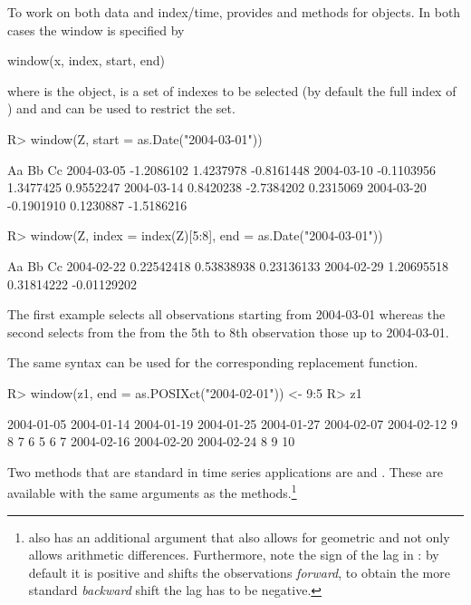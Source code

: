 \documentclass{Z}
\begin{document}
To work on both data and index/time,  provides
 and  methods for  objects.
In both cases the window is specified by
\begin{Scode}
window(x, index, start, end)
\end{Scode}
where  is the  object,  is a set
of indexes to be selected (by default the full index of )
and  and  can be used to restrict the 
 set. 
\begin{Schunk}
\begin{Sinput}
R> window(Z, start = as.Date("2004-03-01"))
\end{Sinput}
\begin{Soutput}
           Aa         Bb         Cc        
2004-03-05 -1.2086102  1.4237978 -0.8161448
2004-03-10 -0.1103956  1.3477425  0.9552247
2004-03-14  0.8420238 -2.7384202  0.2315069
2004-03-20 -0.1901910  0.1230887 -1.5186216
\end{Soutput}
\begin{Sinput}
R> window(Z, index = index(Z)[5:8], end = as.Date("2004-03-01"))
\end{Sinput}
\begin{Soutput}
           Aa          Bb          Cc         
2004-02-22  0.22542418  0.53838938  0.23136133
2004-02-29  1.20695518  0.31814222 -0.01129202
\end{Soutput}
\end{Schunk}

The first example selects all observations starting from 2004-03-01
whereas the second selects from the from the 5th to 8th observation
those up to 2004-03-01.

The same syntax can be used for the corresponding replacement function.
\begin{Schunk}
\begin{Sinput}
R> window(z1, end = as.POSIXct("2004-02-01")) <- 9:5
R> z1
\end{Sinput}
\begin{Soutput}
2004-01-05 2004-01-14 2004-01-19 2004-01-25 2004-01-27 2004-02-07 2004-02-12 
         9          8          7          6          5          6          7 
2004-02-16 2004-02-20 2004-02-24 
         8          9         10 
\end{Soutput}
\end{Schunk}

Two methods that are standard in time series applications
are  and . These are available with the same
arguments as the  methods.\footnote{ also
has an additional argument that also allows for geometric and
not only allows arithmetic differences. Furthermore, note the sign
of the lag in : by default it is positive and shifts the 
observations \emph{forward}, to obtain the more standard \emph{backward}
shift the lag has to be negative.}
\end{document}
